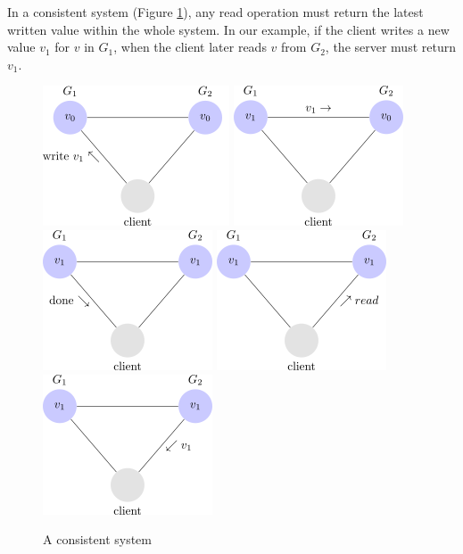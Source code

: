 In a consistent system (Figure \ref{fig:consisten_system}), any read operation must return the latest written value within the whole system. In our example, if the client writes a new value $v_{1}$ for $v$ in $G_{1}$, when the client later reads $v$ from $G_{2}$, the server must return $v_{1}$.
\begin{figure}[h!]
\centering
    \includegraphics[scale=0.45]{assets/images/cap12.png}
    \includegraphics[scale=0.6]{assets/images/cap14.png}
    \includegraphics[scale=0.6]{assets/images/cap17.png}
    \includegraphics[scale=0.6]{assets/images/cap18.png}
    \includegraphics[scale=0.6]{assets/images/cap19.png}
    \caption{A consistent system}
    \label{fig:consisten_system}
\end{figure}

